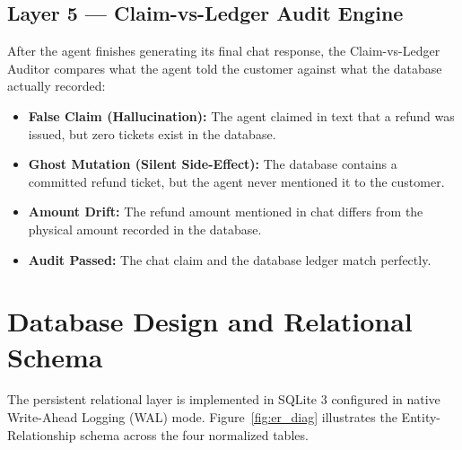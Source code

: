 \subsection{Layer 5 --- Claim-vs-Ledger Audit Engine}
After the agent finishes generating its final chat response, the Claim-vs-Ledger Auditor compares what the agent told the customer against what the database actually recorded:
\begin{itemize}
    \item \textbf{False Claim (Hallucination):} The agent claimed in text that a refund was issued, but zero tickets exist in the database.
    \item \textbf{Ghost Mutation (Silent Side-Effect):} The database contains a committed refund ticket, but the agent never mentioned it to the customer.
    \item \textbf{Amount Drift:} The refund amount mentioned in chat differs from the physical amount recorded in the database.
    \item \textbf{Audit Passed:} The chat claim and the database ledger match perfectly.
\end{itemize}

\section{Database Design and Relational Schema}

The persistent relational layer is implemented in SQLite 3 configured in native Write-Ahead Logging (WAL) mode. Figure~\ref{fig:er_diag} illustrates the Entity-Relationship schema across the four normalized tables.

